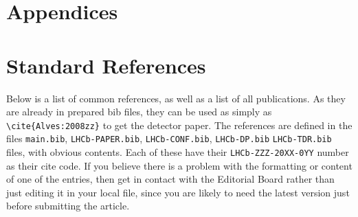 
\section*{Appendices}

\appendix

\section{Standard References}
\label{sec:StandardReferences}
Below is a list of common references, as
well as a list of all \lhcb publications. 
As they are already in prepared bib files, they can be used as simply as
\texttt{\textbackslash cite\{Alves:2008zz\}} to get the \lhcb detector paper. 
The references are defined in the files \texttt{main.bib},  \texttt{LHCb-PAPER.bib},
\texttt{LHCb-CONF.bib}, \texttt{LHCb-DP.bib} \texttt{LHCb-TDR.bib} files, with obvious contents.
Each of these have their \texttt{LHCb-ZZZ-20XX-0YY} number as their cite code.
If you believe there is a problem with the formatting or
content of one of the entries, then get in contact with the Editorial
Board rather than just editing it in your local file,
since you are likely to need the latest version just before submitting the article.


